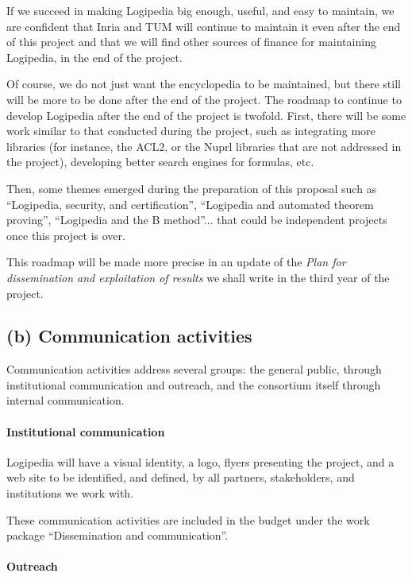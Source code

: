If we succeed in making Logipedia big enough, useful, and easy to
maintain, we are confident that Inria and TUM will continue to
maintain it even after the end of this project and that we will find
other sources of finance for maintaining Logipedia, in the end of the
project.

Of course, we do not just want the encyclopedia to be maintained, but
there still will be more to be done after the end of the project. The
roadmap to continue to develop Logipedia after the end of the project
is twofold. First, there will be some work similar to that conducted
during the project, such as integrating more libraries (for instance,
the ACL2, or the Nuprl libraries that are not addressed in the
project), developing better search engines for formulas, etc.

Then, some themes emerged during the preparation of this proposal such
as ``Logipedia, security, and certification'', ``Logipedia and
automated theorem proving'', ``Logipedia and the B method''... that
could be independent projects once this project is over.

This roadmap will be made more precise in an update of 
the {\em Plan for dissemination and exploitation of results} 
we shall write in the third year of the project.

\subsection*{(b) Communication activities}

Communication activities address several groups: the general public, through
institutional communication and outreach, and the consortium itself through
internal communication.

\paragraph*{Institutional communication}

Logipedia will have a visual identity, a logo, flyers presenting the
project, and a web site to be identified, and defined, by all partners,
stakeholders, and institutions we work with.

These communication activities are included in the budget under the
work package ``Dissemination and communication''.

\paragraph*{Outreach}

